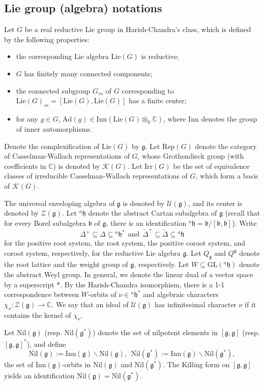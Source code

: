 \documentclass[12pt, a4paper]{amsart}
\numberwithin{equation}{section}
\newcommand{\BC}{{\mathbb {C}}}
\newcommand{\BR}{{\mathbb {R}}}
\newcommand{\CK}{{\mathcal {K}}}
\newcommand{\CU}{{\mathcal {U}}}
\newcommand{\CZ}{{\mathcal {Z}}}
\newcommand{\fb}{\mathfrak{b}}
\newcommand{\fg}{\mathfrak{g}}
\newcommand{\fh}{\mathfrak{h}}
\newcommand{\GL}{{\mathrm{GL}}}
\newcommand{\Irr}{{\mathrm{Irr}}}
\newcommand{\Inn}{{\mathrm{Inn}}}
\newcommand{\Ad}{{\mathrm{Ad}}}
\newcommand{\Lie}{{\mathrm{Lie}}}
\newcommand{\Rep}{{\mathrm{Rep}}}
\newcommand{\Nil}{{\mathrm{Nil}}}
\renewcommand{\bar}{\overline}
\begin{document}
\subsection{Lie group (algebra) notations}
Let $G$ be a real reductive Lie group in Harish-Chandra's class, which is defined by the following properties:
\begin{itemize}
   \item the corresponding Lie algebra $\Lie (G)$ is reductive;
   \item $G$ has finitely many connected components;
   \item the connected subgroup $G_{ss}$ of $G$ corresponding to $\Lie(G)_{ss} = [\Lie(G),\Lie(G)]$ has a finite center;
   \item for any $g \in G$, $\Ad(g) \in \Inn(\Lie(G) \otimes_{\BR} \BC)$, where $\Inn$ denotes the group of inner automorphisms.
\end{itemize}

Denote the complexification of $\Lie(G)$ by $\fg$. Let $\Rep(G)$ denote the category of Casselman-Wallach representations of $G$, whose Grothendieck group (with coefficients in $\BC$) is denoted by $\CK(G)$. Let $\Irr (G)$ be the set of equivalence classes of irreducible Casselman-Wallach representations of $G$, which form a basis of $\CK(G)$.

The universal enveloping algebra of $\fg$ is denoted by $\CU(\fg)$, and its center is denoted by $\CZ(\fg)$. Let $^{a}\fh$ denote the abstract Cartan subalgebra of $\fg$ (recall that for every Borel subalgebra $\fb$ of $\fg$, there is an identification $^{a}\fh = \fb/[\fb,\fb]$). Write 
$$\Delta^+ \subseteq \Delta \subseteq {^{a}\fh^*} \ \ \textrm{and} \ \ \check{\Delta}^+ \subseteq \check{\Delta} \subseteq {^{a}\fh}$$
for the positive root system, the root system, the positive coroot system, and coroot system, respectively, for the reductive Lie algebra $\fg$. Let $Q_{\fg}$ and $Q^{\fg}$ denote the root lattice and the weight group of $\fg$, respectively. Let $W \subseteq \GL(^{a}\fh)$ denote the abstract Weyl group. In general, we denote the linear dual of a vector space by a superscript $*$. By the Harish-Chandra isomorphism, there is a 1-1 correspondence between $W$-orbits of $\nu \in {^{a}\fh^*}$ and algebraic characters $\chi_{\nu}:\CZ(\fg) \to \BC$. We say that an ideal of $\CU(\fg)$ has infinitesimal character $\nu$ if it contains the kernel of $\chi_{\nu}$.

Let $\Nil(\fg)$ (resp. $\Nil(\fg^*)$) denote the set of nilpotent elements in $[\fg,\fg]$ (resp. $[\fg,\fg]^*$), and define
\begin{equation}
   \bar{\Nil}(\fg) := \Inn(\fg) \backslash \Nil(\fg), \ \  \bar{\Nil}(\fg^*) := \Inn(\fg) \backslash \Nil(\fg^*),
\end{equation}
the set of $\Inn(\fg)$-orbits in $\Nil(\fg)$ and $\Nil(\fg^*)$. The Killing form on $[\fg,\fg]$ yields an identification $\bar{\Nil}(\fg) = \bar{\Nil}(\fg^*)$.
\end{document}
